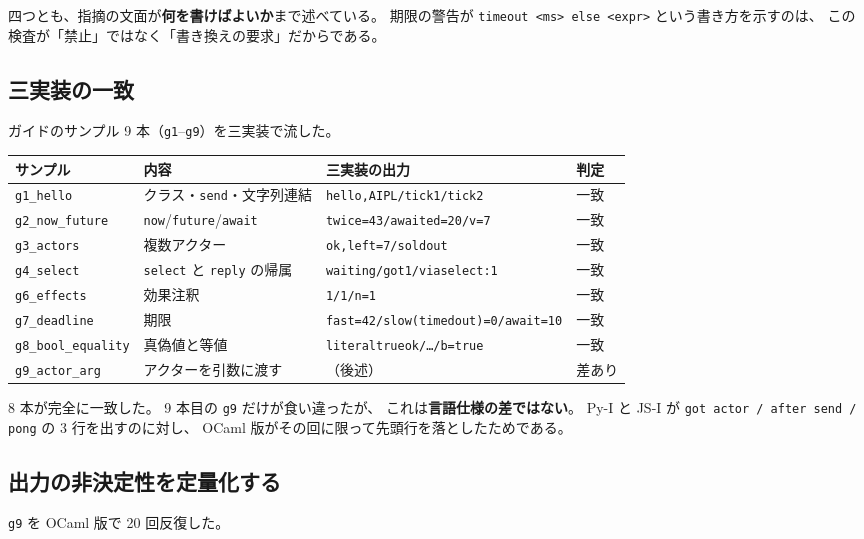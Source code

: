 \documentclass[11pt,a4paper]{ltjsarticle}
\theoremstyle{definition}
\theoremstyle{remark}
\begin{document}
四つとも、指摘の文面が\textbf{何を書けばよいか}まで述べている。
期限の警告が \texttt{timeout <ms> else <expr>} という書き方を示すのは、
この検査が「禁止」ではなく「書き換えの要求」だからである。

\subsection{三実装の一致}

ガイドのサンプル 9 本（\texttt{g1}--\texttt{g9}）を三実装で流した。

\begin{center}
\begin{tabular}{llll}
\toprule
サンプル & 内容 & 三実装の出力 & 判定 \\
\midrule
\texttt{g1\_hello}        & クラス・\texttt{send}・文字列連結 & \texttt{hello,AIPL/tick1/tick2} & 一致 \\
\texttt{g2\_now\_future}  & \texttt{now}/\texttt{future}/\texttt{await} & \texttt{twice=43/awaited=20/v=7} & 一致 \\
\texttt{g3\_actors}       & 複数アクター & \texttt{ok,left=7/soldout} & 一致 \\
\texttt{g4\_select}       & \texttt{select} と \texttt{reply} の帰属 & \texttt{waiting/got1/viaselect:1} & 一致 \\
\texttt{g6\_effects}      & 効果注釈 & \texttt{1/1/n=1} & 一致 \\
\texttt{g7\_deadline}     & 期限 & \texttt{fast=42/slow(timedout)=0/await=10} & 一致 \\
\texttt{g8\_bool\_equality} & 真偽値と等値 & \texttt{literaltrueok/\ldots/b=true} & 一致 \\
\texttt{g9\_actor\_arg}   & アクターを引数に渡す & （後述） & 差あり \\
\bottomrule
\end{tabular}
\end{center}

8 本が完全に一致した。
9 本目の \texttt{g9} だけが食い違ったが、
これは\textbf{言語仕様の差ではない}。
Py-I と JS-I が \texttt{got actor / after send / pong} の 3 行を出すのに対し、
OCaml 版がその回に限って先頭行を落としたためである。

\subsection{出力の非決定性を定量化する}

\texttt{g9} を OCaml 版で 20 回反復した。
\end{document}

